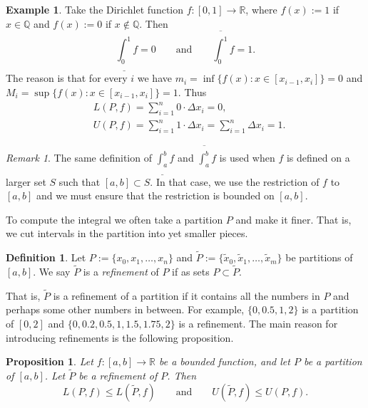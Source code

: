 \documentclass[12pt]{book}
\newcommand{\R}{{\mathbb{R}}}
\newcommand{\Q}{{\mathbb{Q}}}
\theoremstyle{plain}
\newtheorem{prop}[thm]{Proposition}
\theoremstyle{remark}
\newtheorem{remark}[thm]{Remark}
\theoremstyle{definition}
\newtheorem{defn}[thm]{Definition}
\theoremstyle{exercise}
\theoremstyle{example}
\newtheorem{example}[thm]{Example}
\begin{document}
\begin{example}
Take the Dirichlet function $f \colon [0,1] \to \R$, where $f(x) := 1$ if
$x \in \Q$ and $f(x) := 0$ if $x \notin \Q$.  Then
\begin{equation*}
\underline{\int_0^1} f = 0 \qquad \text{and} \qquad
\overline{\int_0^1} f = 1 .
\end{equation*}
The reason is that for every $i$ we have 
$m_i = \inf \{ f(x) : x \in [x_{i-1},x_i] \} = 0$  and
$M_i = \sup \{ f(x) : x \in [x_{i-1},x_i] \} = 1$.  Thus
\begin{align*}
& L(P,f) = \sum_{i=1}^n 0 \cdot \Delta x_i = 0 , \\
& U(P,f) = \sum_{i=1}^n 1 \cdot \Delta x_i = \sum_{i=1}^n \Delta x_i = 1  .
\end{align*}
\end{example}

\begin{remark}
The same definition of $\underline{\int_a^b} f$ and
$\overline{\int_a^b} f$
is used when $f$ is defined on a larger set $S$ such that
$[a,b] \subset S$.  In that case, we use the restriction of $f$ to $[a,b]$
and we must ensure that the restriction is bounded on $[a,b]$.
\end{remark}

To compute the integral we often take a partition $P$ and make it finer.
That is, we cut intervals in the partition into yet smaller pieces.

\begin{defn}
Let $P := \{ x_0, x_1, \ldots, x_n \}$ and
$\widetilde{P} := \{ \widetilde{x}_0, \widetilde{x}_1, \ldots, \widetilde{x}_m \}$ be
partitions of $[a,b]$.  We say $\widetilde{P}$ is a
\emph{refinement} of $P$
if as sets $P \subset \widetilde{P}$.
\end{defn}

That is, $\widetilde{P}$ is a refinement of a partition if it contains all the
numbers in $P$ and perhaps some other numbers in between.  For example,
$\{ 0, 0.5, 1, 2 \}$ is a partition of $[0,2]$ and
$\{ 0, 0.2, 0.5, 1, 1.5, 1.75, 2 \}$ is a refinement.
The main reason for introducing refinements is the following proposition.

\begin{prop} \label{prop:refinement}
Let $f \colon [a,b] \to \R$ be a bounded function, and let $P$
be a partition of $[a,b]$.  Let $\widetilde{P}$ be a refinement of $P$.
Then
\begin{equation*}
L(P,f) \leq L(\widetilde{P},f) 
\qquad \text{and} \qquad
U(\widetilde{P},f) \leq U(P,f) .
\end{equation*}
\end{prop}
\end{document}
